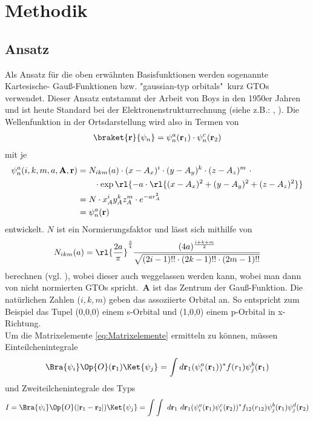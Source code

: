 \section{Methodik}
%
%
%
\subsection{Ansatz}
%
Als Ansatz für die oben erwähnten Basisfunktionen werden sogenannte Kartesische-
Gauß-Funktionen bzw. "gaussian-typ orbitals"\ kurz GTOs verwendet. Dieser Ansatz
entstammt der Arbeit von Boys in den 1950er Jahren \cite{av:5a} und ist heute
Standard bei der Elektronenstrukturrechnung (siehe z.B.: \cite{b:3a},
\cite{b:2a}). Die Wellenfunktion in der Ortsdarstellung wird 
also in
Termen von 
%
\begin{align}
\braket{\textbf{r}}{\psi_n}=\psi_n^a(\textbf{r}_1)\cdot\psi_n^c(\textbf{r}_2)
\end{align}
%
mit je
%
\begin{align}\nonumber
\psi_n^a(i,k,m,a,\textbf{A},\textbf{r})&=N_{ikm}(a)\cdot (x-A_x)^i\cdot 
(y-A_y)^k\cdot (z-A_z)^m\  \cdot\\ \label{eq:Produktansatz}
& \qquad \cdot \exp\rl{-a\cdot 
	\rl{(x-A_x)^2+(y-A_y)^2+(z-A_z)^2}}\\\nonumber
%
&= N\cdot x_A^iy_A^kz_A^m\cdot e^{-a r_A^2}\\\nonumber
&= \psi_n^a(\textbf{r})
\end{align}
%
entwickelt. $N$ ist ein Normierungsfaktor und lässt sich mithilfe von 
%
\begin{align}\label{eq:NORM}
	N_{ikm}(a)=\rl{\frac{2a}{\pi}}^\frac{3}{4}\frac{(4a)^\frac{i+k+m}{2}}{\sqrt{(2i-1)!!\cdot(2k-1)!!\cdot(2m-1)!!}}
\end{align}
%
berechnen (vgl. \cite{av:2a}), wobei dieser auch weggelassen werden kann, wobei 
man dann von nicht normierten GTOs spricht.\ \textbf{A} ist 
das 
Zentrum der Gauß-Funktion. Die natürlichen Zahlen ($i,k,m$) geben das 
assoziierte Orbital an. So entspricht zum Beispiel das Tupel (0,0,0) einem 
s-Orbital und (1,0,0) einem p-Orbital in x-Richtung.\\
Um die Matrixelemente \ref{eq:Matrixelemente} ermitteln zu können, müssen 
Einteilchenintegrale
%
\begin{align}\label{eq:1T-Integrale}
\Bra{\psi_i}\Op{O}(\textbf{r}_1)\Ket{\psi_j}  = 
\int  d\textbf{r}_1 
(\psi_i^{a}(\textbf{r}_1) )^*
f(r_1) 
\psi_j^b(\textbf{r}_1)
\end{align}
%
und Zweiteilchenintegrale des Typs
%
\begin{align}\label{eq:2T-Integrale}
I=\Bra{\psi_i}\Op{O}(|\textbf{r}_1-\textbf{r}_2|)\Ket{\psi_j} = \int 
\int\ 
d\textbf{r}_1\ d\textbf{r}_1 
(\psi_i^a(\textbf{r}_1)\psi_i^c(\textbf{r}_2))^* f_{12}(r_{12}) 
\psi_j^b(\textbf{r}_1)\psi_j^d(\textbf{r}_2)
\end{align}
